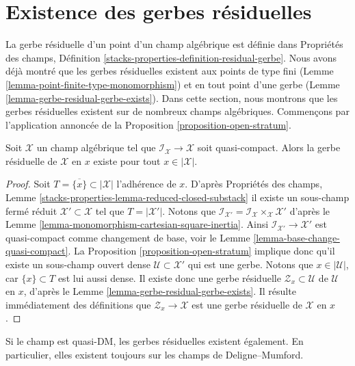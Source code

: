 \section{Existence des gerbes résiduelles}
\label{section-existence-residual-gerbes}

\noindent
La gerbe résiduelle d'un point d'un champ algébrique est définie dans
Propriétés des champs, Définition
\ref{stacks-properties-definition-residual-gerbe}.
Nous avons déjà montré que les gerbes résiduelles existent aux points
de type fini (Lemme \ref{lemma-point-finite-type-monomorphism})
et en tout point d'une gerbe (Lemme \ref{lemma-gerbe-residual-gerbe-exists}).
Dans cette section, nous montrons que les gerbes résiduelles existent sur
de nombreux champs algébriques. Commençons par l'application annoncée de la
Proposition \ref{proposition-open-stratum}.

\begin{lemma}
\label{lemma-every-point-residual-gerbe}
Soit $\mathcal{X}$ un champ algébrique tel que
$\mathcal{I}_\mathcal{X} \to \mathcal{X}$ soit quasi-compact.
Alors la gerbe résiduelle de $\mathcal{X}$ en $x$ existe pour tout
$x \in |\mathcal{X}|$.
\end{lemma}

\begin{proof}
Soit $T = \overline{\{x\}} \subset |\mathcal{X}|$ l'adhérence de $x$.
D'après Propriétés des champs, Lemme
\ref{stacks-properties-lemma-reduced-closed-substack}
il existe un sous-champ fermé réduit $\mathcal{X}' \subset \mathcal{X}$
tel que $T = |\mathcal{X}'|$. Notons que
$\mathcal{I}_{\mathcal{X}'} =
\mathcal{I}_\mathcal{X} \times_\mathcal{X} \mathcal{X}'$ d'après le
Lemme \ref{lemma-monomorphism-cartesian-square-inertia}.
Ainsi $\mathcal{I}_{\mathcal{X}'} \to \mathcal{X}'$ est quasi-compact
comme changement de base, voir le
Lemme \ref{lemma-base-change-quasi-compact}.
La Proposition \ref{proposition-open-stratum} implique donc qu'il existe
un sous-champ ouvert dense
$\mathcal{U} \subset \mathcal{X}'$
qui est une gerbe. Notons que $x \in |\mathcal{U}|$, car
$\{x\} \subset T$ est lui aussi dense. Il existe donc une gerbe résiduelle
$\mathcal{Z}_x \subset \mathcal{U}$ de $\mathcal{U}$ en $x$, d'après le
Lemme \ref{lemma-gerbe-residual-gerbe-exists}.
Il résulte immédiatement des définitions que $\mathcal{Z}_x \to \mathcal{X}$
est une gerbe résiduelle de $\mathcal{X}$ en $x$.
\end{proof}

\noindent
Si le champ est quasi-DM, les gerbes résiduelles existent également.
En particulier, elles existent toujours sur les champs de Deligne--Mumford.

